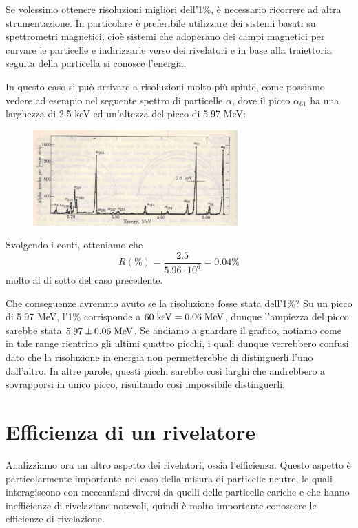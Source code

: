 \begin{esempio}
   Se volessimo ottenere risoluzioni migliori dell'1\%, è necessario ricorrere ad altra strumentazione. In particolare è preferibile utilizzare dei sistemi basati su spettrometri magnetici, cioè sistemi che adoperano dei campi magnetici per curvare le particelle e indirizzarle verso dei rivelatori e in base alla traiettoria seguita della particella si conosce l'energia. 

   In questo caso si può arrivare a risoluzioni molto più spinte, come possiamo vedere ad esempio nel seguente spettro di particelle $\alpha$, dove il picco $\alpha_{61}$ ha una larghezza di 2.5 keV ed un'altezza del picco di 5.97 MeV:
   \begin{figure}[H]
      \centering
      \includegraphics[width=0.7\textwidth]{immagini/spettro_alpha_riv_spettrometro.png}
   \end{figure}
   Svolgendo i conti, otteniamo che
   \begin{equation*}
      R(\%)=\frac{2.5}{5.96 \cdot 10^6}=0.04\%
   \end{equation*}
   molto al di sotto del caso precedente.

   Che conseguenze avremmo avuto se la risoluzione fosse stata dell'1\%? Su un picco di 5.97 MeV, l'1\% corrisponde a $\rm 60 \; keV=0.06 \; MeV$, dunque l'ampiezza del picco sarebbe stata $\rm 5.97 \pm 0.06 \; MeV$. Se andiamo a guardare il grafico, notiamo come in tale range rientrino gli ultimi quattro picchi, i quali dunque verrebbero confusi dato che la risoluzione in energia non permetterebbe di distinguerli l'uno dall'altro. In altre parole, questi picchi sarebbe così larghi che andrebbero a sovrapporsi in unico picco, risultando così impossibile distinguerli.
\end{esempio}
\section{Efficienza di un rivelatore}
Analizziamo ora un altro aspetto dei rivelatori, ossia l'efficienza. Questo aspetto è particolarmente importante nel caso della misura di particelle neutre, le quali interagiscono con meccanismi diversi da quelli delle particelle cariche e che hanno inefficienze di rivelazione notevoli, quindi è molto importante conoscere le efficienze di rivelazione.
